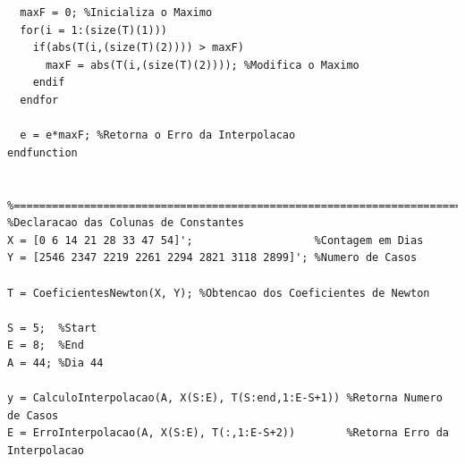 \documentclass{article}
\begin{document}
\begin{scriptsize}
\begin{lstlisting}
  maxF = 0; %Inicializa o Maximo
  for(i = 1:(size(T)(1)))
    if(abs(T(i,(size(T)(2)))) > maxF)
      maxF = abs(T(i,(size(T)(2)))); %Modifica o Maximo
    endif
  endfor
  
  e = e*maxF; %Retorna o Erro da Interpolacao
endfunction


%====================================================================================
%Declaracao das Colunas de Constantes
X = [0 6 14 21 28 33 47 54]';                   %Contagem em Dias
Y = [2546 2347 2219 2261 2294 2821 3118 2899]'; %Numero de Casos

T = CoeficientesNewton(X, Y); %Obtencao dos Coeficientes de Newton

S = 5;  %Start 
E = 8;  %End
A = 44; %Dia 44

y = CalculoInterpolacao(A, X(S:E), T(S:end,1:E-S+1)) %Retorna Numero de Casos
E = ErroInterpolacao(A, X(S:E), T(:,1:E-S+2))        %Retorna Erro da Interpolacao
    \end{lstlisting}
\end{scriptsize}
\end{document}
